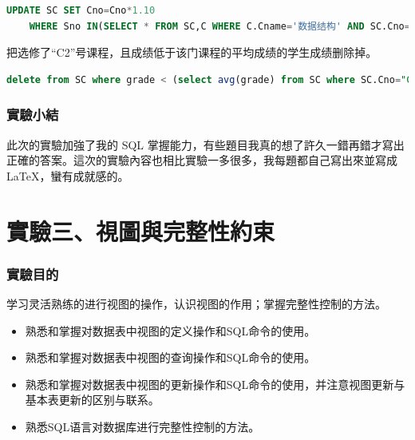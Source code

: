 \documentclass[12pt, a4paper]{report}
\begin{document}
\begin{lstlisting}[language=SQL]
    UPDATE SC SET Cno=Cno*1.10 
    WHERE Sno IN(SELECT * FROM SC,C WHERE C.Cname='数据结构' AND SC.Cno=C.Cno);
\end{lstlisting}

把选修了“C2”号课程，且成绩低于该门课程的平均成绩的学生成绩删除掉。\\

\begin{lstlisting}[language=SQL]
    delete from SC where grade < (select avg(grade) from SC where SC.Cno="C2");
\end{lstlisting}

\begin{figure}[H] %
    \centering %
\end{figure}

\section{實驗小結}

此次的實驗加強了我的 SQL 掌握能力，有些題目我真的想了許久一錯再錯才寫出正確的答案。這次的實驗內容也相比實驗一多很多，我每題都自己寫出來並寫成 LaTeX，蠻有成就感的。

\part{實驗三、視圖與完整性約束}

\section{實驗目的}

学习灵活熟练的进行视图的操作，认识视图的作用；掌握完整性控制的方法。

\begin{itemize}
    \item 熟悉和掌握对数据表中视图的定义操作和SQL命令的使用。
    \item 熟悉和掌握对数据表中视图的查询操作和SQL命令的使用。
    \item 熟悉和掌握对数据表中视图的更新操作和SQL命令的使用，并注意视图更新与基本表更新的区别与联系。
    \item 熟悉SQL语言对数据库进行完整性控制的方法。
\end{itemize}
\end{document}
